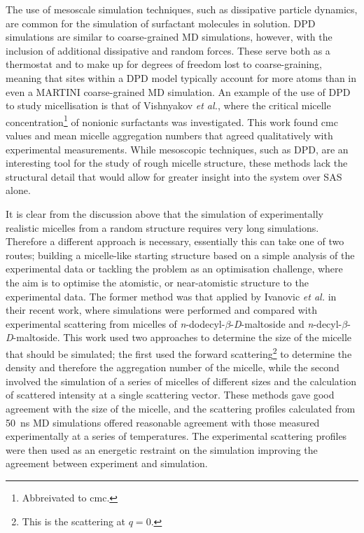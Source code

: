 The use of mesoscale simulation techniques, such as dissipative particle dynamics, are common for the simulation of surfactant molecules in solution.
DPD simulations are similar to coarse-grained MD simulations, however, with the inclusion of additional dissipative and random forces.
These serve both as a thermostat and to make up for degrees of freedom lost to coarse-graining, meaning that sites within a DPD model typically account for more atoms than in even a MARTINI coarse-grained MD simulation.
An example of the use of DPD to study micellisation is that of Vishnyakov \emph{et al.}, where the critical micelle concentration\footnote{Abbreivated to cmc.} of nonionic surfactants was investigated.
This work found cmc values and mean micelle aggregation numbers that agreed qualitatively with experimental measurements.
While mesoscopic techniques, such as DPD, are an interesting tool for the study of rough micelle structure, these methods lack the structural detail that would allow for greater insight into the system over SAS alone.

It is clear from the discussion above that the simulation of experimentally realistic micelles from a random structure requires very long simulations.
Therefore a different approach is necessary, essentially this can take one of two routes; building a micelle-like starting structure based on a simple analysis of the experimental data or tackling the problem as an optimisation challenge, where the aim is to optimise the atomistic, or near-atomistic structure to the experimental data.
The former method was that applied by Ivanovic \emph{et al.} in their recent work, where simulations were performed and compared with experimental scattering from micelles of \emph{n}-dodecyl-$\beta$-\emph{D}-maltoside and \emph{n}-decyl-$\beta$-\emph{D}-maltoside.
This work used two approaches to determine the size of the micelle that should be simulated; the first used the forward scattering\footnote{This is the scattering at $q=0$.} to determine the density and therefore the aggregation number of the micelle, while the second involved the simulation of a series of micelles of different sizes and the calculation of scattered intensity at a single scattering vector.
These methods gave good agreement with the size of the micelle, and the scattering profiles calculated from \SI{50}{\nano\second} MD simulations offered reasonable agreement with those measured experimentally at a series of temperatures.
The experimental scattering profiles were then used as an energetic restraint on the simulation improving the agreement between experiment and simulation.

